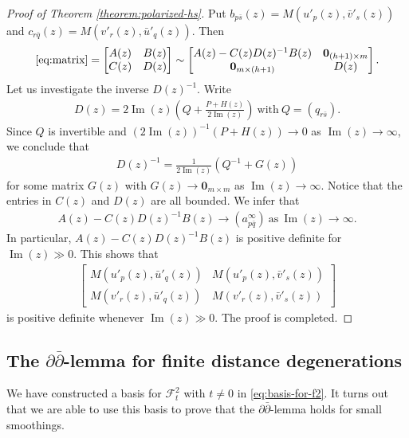 \begin{proof}[Proof of Theorem \ref{theorem:polarized-hs}]
Put \(b_{p\bar{s}}(z)=M(u'_{p}(z),\bar{v}'_{s}(z))\)
and \(c_{r\bar{q}}(z)=M(v'_{r}(z),\bar{u}'_{q}(z))\). Then
\begin{eqnarray*}
\eqref{eq:matrix}=
\begin{bmatrix}
A(z) & B(z) \\
C(z) & D(z)
\end{bmatrix}\sim
\begin{bmatrix}
A(z)-C(z)D(z)^{-1}B(z) & \mathbf{0}_{(h+1)\times m} \\
\mathbf{0}_{m\times (h+1)} & D(z)
\end{bmatrix}.
\end{eqnarray*}
Let us investigate the inverse \(D(z)^{-1}\). Write
\begin{eqnarray*}
D(z) = 2\operatorname{Im}(z)\left(Q+\frac{P+H(z)}{2\operatorname{Im}(z)}\right)~
\mbox{with}~Q=(q_{r\bar{s}}).
\end{eqnarray*}
Since \(Q\) is invertible and \((2\operatorname{Im}(z))^{-1}(P+H(z))\to 0\)
as \(\operatorname{Im}(z)\to \infty\), we conclude that
\begin{eqnarray*}
D(z)^{-1}=\frac{1}{2\operatorname{Im}(z)}\left(Q^{-1}+G(z)\right)
\end{eqnarray*}
for some matrix \(G(z)\) with \(G(z)\to \mathbf{0}_{m\times m}\) as
\(\operatorname{Im}(z)\to\infty\).
Notice that the entries in \(C(z)\) and \(D(z)\) are all bounded.
We infer that
\begin{eqnarray*}
A(z)-C(z)D(z)^{-1}B(z)\to (a_{p\bar{q}}^{\infty})~\mbox{as}~\operatorname{Im}(z)\to\infty.
\end{eqnarray*}
In particular, \(A(z)-C(z)D(z)^{-1}B(z)\)
is positive definite for \(\operatorname{Im}(z)\gg 0\).
This shows that
\begin{eqnarray*}
\begin{bmatrix}
M(u'_{p}(z),\bar{u}'_{q}(z)) & M(u'_{p}(z),\bar{v}'_{s}(z))\\
M(v'_{r}(z),\bar{u}'_{q}(z)) & M(v'_{r}(z),\bar{v}'_{s}(z))
\end{bmatrix}
\end{eqnarray*}
is positive definite whenever \(\operatorname{Im}(z)\gg 0\). The proof is completed.
\end{proof}


\subsection{The \(\partial\bar{\partial}\)-lemma for finite distance degenerations}
We have constructed a basis for 
\(\mathcal{F}^{2}_{t}\) with \(t\ne 0\) in \eqref{eq:basis-for-f2}. 
It turns out that we are able to use this basis to prove that 
the \(\partial\bar{\partial}\)-lemma holds for
small smoothings.

